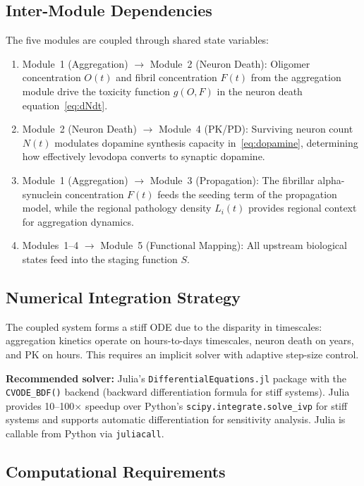 \subsection{Inter-Module Dependencies}

The five modules are coupled through shared state variables:

\begin{enumerate}
\item Module~1 (Aggregation) $\to$ Module~2 (Neuron Death): Oligomer concentration $O(t)$ and fibril concentration $F(t)$ from the aggregation module drive the toxicity function $g(O, F)$ in the neuron death equation~\eqref{eq:dNdt}.

\item Module~2 (Neuron Death) $\to$ Module~4 (PK/PD): Surviving neuron count $N(t)$ modulates dopamine synthesis capacity in~\eqref{eq:dopamine}, determining how effectively levodopa converts to synaptic dopamine.

\item Module~1 (Aggregation) $\to$ Module~3 (Propagation): The fibrillar alpha-synuclein concentration $F(t)$ feeds the seeding term of the propagation model, while the regional pathology density $L_i(t)$ provides regional context for aggregation dynamics.

\item Modules~1--4 $\to$ Module~5 (Functional Mapping): All upstream biological states feed into the staging function $S$.
\end{enumerate}

\subsection{Numerical Integration Strategy}

The coupled system forms a stiff ODE due to the disparity in timescales: aggregation kinetics operate on hours-to-days timescales, neuron death on years, and PK on hours. This requires an implicit solver with adaptive step-size control.

\textbf{Recommended solver:} Julia's \texttt{DifferentialEquations.jl} package with the \texttt{CVODE\_BDF()} backend (backward differentiation formula for stiff systems). Julia provides 10--100$\times$ speedup over Python's \texttt{scipy.integrate.solve\_ivp} for stiff systems and supports automatic differentiation for sensitivity analysis. Julia is callable from Python via \texttt{juliacall}.

\subsection{Computational Requirements}


